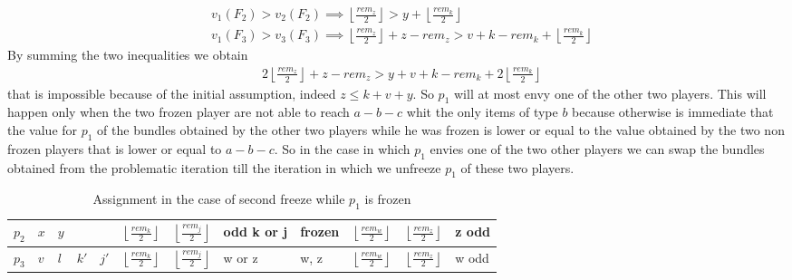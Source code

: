 \documentclass{article}
\newcommand{\floor}[3][2]{\left \lfloor\frac{#2}{#3}\right \rfloor}
\begin{document}
\begin{itemize}
    \begin{align*}
        &v_1(F_2) > v_2(F_2)\implies \floor{rem_z}{2} > y + \floor{rem_k}{2} \\
        &v_1(F_3) > v_3(F_3)\implies \floor{rem_z}{2} + z-rem_z > v + k - rem_k+  \floor{rem_k}{2} 
    \end{align*}
    By summing the two inequalities we obtain
    \begin{align*}
        &2\floor{rem_z}{2} + z-rem_z > y + v + k - rem_k+  2\floor{rem_k}{2} 
    \end{align*}
    that is impossible because of the initial assumption, indeed $z \le k + v + y$.
    So $p_1$ will at most envy one of the other two players. This will happen only when the two frozen player are not able to reach $a-b-c$ whit the only items of type $b$ because otherwise is immediate that the value for $p_1$ of the bundles obtained by the other two players while he was frozen is lower or equal to the value obtained by the two non frozen players that is lower or equal to $a-b-c$. So in the case in which $p_1$ envies one of the two other players we can swap the bundles obtained from the problematic iteration till the iteration in which we unfreeze $p_1$ of these two players.
    
    \begin{table}[h]
        \begin{tabular}{|l|l|l|l|l|l|l|l|l|l|l|l|}
            \hline
            $p_2$ & $x$ & $y$ &      &    &   $\floor{rem_k}{2}$ & $\floor{rem_j}{2}$ & odd k or j & frozen & $\floor{rem_w}{2}$ & $\floor{rem_z}{2}$ & z odd \\ \hline
            $p_3$ & $v$ & $l$ & $k'$ & $j'$ & $\floor{rem_k}{2}$ & $\floor{rem_j}{2}$ & w or z     & w, z   & $\floor{rem_w}{2}$ & $\floor{rem_z}{2}$ & w odd \\ \hline
        \end{tabular}
        \caption{Assignment in the case of second freeze while $p_1$ is frozen}
        \label{table:abb-abb-abb-assignment-in-the-case-of-second-freeze}
    \end{table}
    

\end{itemize}
\end{document}
